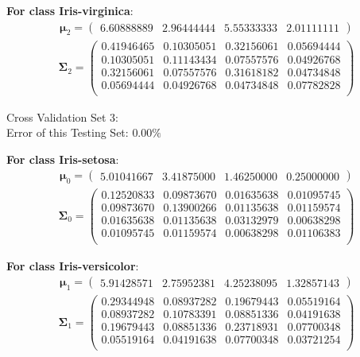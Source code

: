 \documentclass[11pt,a4paper]{article}
\newcommand{\htab}{\hspace*{0.63cm}}
\newcommand{\bs}[1]{\boldsymbol{#1}}
\begin{document}
\textbf{For class Iris-virginica}:
\begin{align} \bs{\mu}_{2} = \begin{pmatrix} 
6.60888889 & 2.96444444 & 5.55333333 & 2.01111111 
 \end{pmatrix}  \end{align} 
\vspace{-1cm}
\begin{align} \bs{\Sigma}_{2} = \begin{pmatrix} 
0.41946465 & 0.10305051 & 0.32156061 & 0.05694444 \\ 
0.10305051 & 0.11143434 & 0.07557576 & 0.04926768 \\ 
0.32156061 & 0.07557576 & 0.31618182 & 0.04734848 \\ 
0.05694444 & 0.04926768 & 0.04734848 & 0.07782828 \\ 
\end{pmatrix} \end{align}

\newpage

Cross Validation Set 3: \\
\htab Error of this Testing Set: $0.00\%$ 

\textbf{For class Iris-setosa}:
\begin{align} \bs{\mu}_{0} = \begin{pmatrix} 
5.01041667 & 3.41875000 & 1.46250000 & 0.25000000 
 \end{pmatrix}  \end{align} 
\vspace{-1cm}
\begin{align} \bs{\Sigma}_{0} = \begin{pmatrix} 
0.12520833 & 0.09873670 & 0.01635638 & 0.01095745 \\ 
0.09873670 & 0.13900266 & 0.01135638 & 0.01159574 \\ 
0.01635638 & 0.01135638 & 0.03132979 & 0.00638298 \\ 
0.01095745 & 0.01159574 & 0.00638298 & 0.01106383 \\ 
\end{pmatrix} \end{align}

\textbf{For class Iris-versicolor}:
\begin{align} \bs{\mu}_{1} = \begin{pmatrix} 
5.91428571 & 2.75952381 & 4.25238095 & 1.32857143 
 \end{pmatrix}  \end{align} 
\vspace{-1cm}
\begin{align} \bs{\Sigma}_{1} = \begin{pmatrix} 
0.29344948 & 0.08937282 & 0.19679443 & 0.05519164 \\ 
0.08937282 & 0.10783391 & 0.08851336 & 0.04191638 \\ 
0.19679443 & 0.08851336 & 0.23718931 & 0.07700348 \\ 
0.05519164 & 0.04191638 & 0.07700348 & 0.03721254 \\ 
\end{pmatrix} \end{align}
\end{document}
